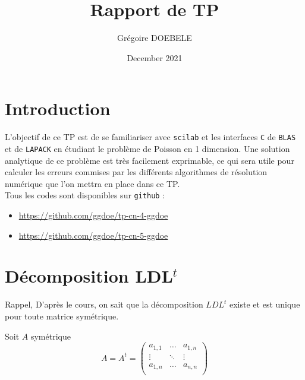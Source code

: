 \documentclass{article}
\title{Rapport de TP}
\author{Grégoire DOEBELE }
\date{December 2021}
\begin{document}
\newcommand{\tikzmark}[1]{\tikz[overlay,remember picture] \node (#1) {};}
\newcommand{\DrawBox}[4][]{%
    \tikz[overlay,remember picture]{%
        \coordinate (TopLeft)     at ($(#2)+(-0.2em,0.9em)$);
        \coordinate (BottomRight) at ($(#3)+(0.2em,-0.3em)$);
        \path (TopLeft); \pgfgetlastxy{\XCoord}{\IgnoreCoord};
        \path (BottomRight); \pgfgetlastxy{\IgnoreCoord}{\YCoord};
        \coordinate (LabelPoint) at ($(\XCoord,\YCoord)!0.5!(BottomRight)$);
        \draw [red,#1] (TopLeft) rectangle (BottomRight);
        \node [below, #1, fill=none, fill opacity=1] at (LabelPoint) {#4};
    }
}


\maketitle

\section{Introduction}
L'objectif de ce TP est de se familiariser avec \texttt{scilab} et les interfaces \texttt{C} de \texttt{BLAS} et de \texttt{LAPACK} en étudiant le problème de Poisson en 1 dimension. Une solution analytique de ce problème est très facilement exprimable, ce qui sera utile pour calculer les erreurs commises par les différents algorithmes de résolution numérique que l'on mettra en place dans ce TP.
\\\newline\noindent
Tous les codes sont disponibles sur \texttt{github} :
\begin{itemize}
\item \href{https://github.com/ggdoe/tp-cn-4-ggdoe}{https://github.com/ggdoe/tp-cn-4-ggdoe}
\item \href{https://github.com/ggdoe/tp-cn-5-ggdoe}{https://github.com/ggdoe/tp-cn-5-ggdoe}
\end{itemize}

\section{Décomposition LDL\(^t\)}

Rappel,\newline
D'après le cours, on sait que la décomposition \(LDL^t\) existe et est unique pour toute matrice symétrique.

Soit \(A\) symétrique
\[
	A = A^t = 
	\begin{pmatrix}
	a_{1,1}	& \dots	& a_{1,n} 	\\
	\vdots	& \ddots& \vdots	\\
	a_{1,n}	& \dots & a_{n,n} 	\\
	\end{pmatrix}
\]
\end{document}
